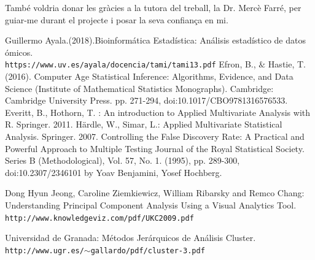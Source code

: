 \documentclass[english]{article}
\begin{document}
També voldria donar les gràcies a la tutora del treball, la Dr. Mercè Farré, per guiar-me durant el projecte i posar la seva confian\c{c}a en mi.
\clearpage
\begin{thebibliography}{aaaa}
Guillermo Ayala.(2018).Bioinformática Estadística: Análisis estadístico de datos ómicos. \label{aya}
\\\texttt{https://www.uv.es/ayala/docencia/tami/tami13.pdf}
Efron, B., $\&$ Hastie, T. (2016). Computer Age Statistical Inference: Algorithms, Evidence, and Data Science (Institute of Mathematical Statistics Monographs). Cambridge: Cambridge University Press. pp. 271-294, doi:10.1017/CBO9781316576533. \label{efron}
Everitt, B., Hothorn, T. : An introduction to Applied Multivariate Analysis with R. Springer. 2011. \label{Evertit}
Härdle, W., Simar, L.: Applied Multivariate Statistical Analysis. Springer. 2007. \label{hardle}
Controlling the False Discovery Rate: A Practical and Powerful Approach to Multiple Testing Journal of the Royal Statistical Society. Series B (Methodological), Vol. 57, No. 1. (1995), pp. 289-300, doi:10.2307/2346101 by Yoav Benjamini, Yosef Hochberg. \label{fdrr}

Dong Hyun Jeong, Caroline Ziemkiewicz, William Ribarsky and Remco Chang: Understanding Principal Component Analysis Using a Visual Analytics Tool. \label{dong}
\\\texttt{http://www.knowledgeviz.com/pdf/UKC2009.pdf}

Universidad de Granada: Métodos Jerárquicos de Análisis Cluster. \label{gran}
\\\texttt{http://www.ugr.es/$\sim$gallardo/pdf/cluster-3.pdf}

\end{thebibliography}
\clearpage
\appendix
\onecolumn
\end{document}
